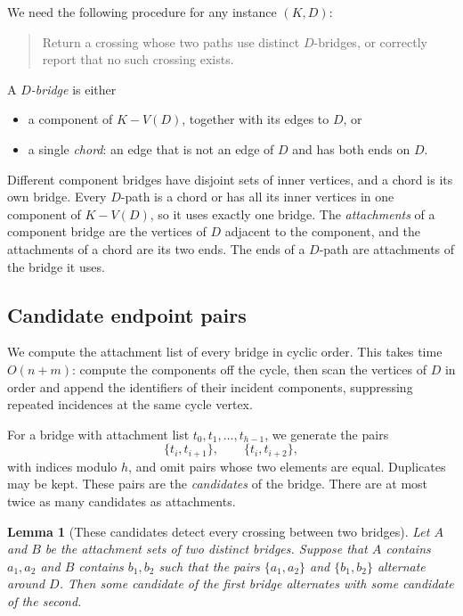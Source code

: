 \documentclass[11pt]{article}
\newtheorem{lemma}{Lemma}
\begin{document}
We need the following procedure for any instance $(K,D)$:
\begin{quote}
Return a crossing whose two paths use distinct $D$-bridges, or correctly report
that no such crossing exists.
\end{quote}
A \emph{$D$-bridge} is either
\begin{itemize}[nosep]
\item a component of $K-V(D)$, together with its edges to $D$, or
\item a single \emph{chord}: an edge that is not an edge of $D$ and has both
ends on $D$.
\end{itemize}
Different component bridges have disjoint sets of inner vertices, and a chord
is its own bridge. Every $D$-path is a chord or has all its inner vertices in
one component of $K-V(D)$, so it uses exactly one bridge. The
\emph{attachments} of a component bridge are the vertices of $D$ adjacent to
the component, and the attachments of a chord are its two ends. The ends of a
$D$-path are attachments of the bridge it uses.

\subsection{Candidate endpoint pairs}\label{sec:candidates}

We compute the attachment list of every bridge in cyclic order. This takes time
$O(n+m)$: compute the components off the cycle, then scan the vertices of $D$
in order and append the identifiers of their incident components, suppressing
repeated incidences at the same cycle vertex.

For a bridge with attachment list $t_0,t_1,\ldots,t_{h-1}$, we generate the
pairs
\begin{equation*}
\{t_i,t_{i+1}\},
\qquad
\{t_i,t_{i+2}\},
\end{equation*}
with indices modulo $h$, and omit pairs whose two elements are equal.
Duplicates may be kept. These pairs are the \emph{candidates} of the bridge.
There are at most twice as many candidates as attachments.

\begin{lemma}[These candidates detect every crossing between two bridges]\label{lem:candidates}
Let $A$ and $B$ be the attachment sets of two distinct bridges. Suppose that
$A$ contains $a_1,a_2$ and $B$ contains $b_1,b_2$ such that the pairs
$\{a_1,a_2\}$ and $\{b_1,b_2\}$ alternate around $D$. Then some candidate of
the first bridge alternates with some candidate of the second.
\end{lemma}
\end{document}
